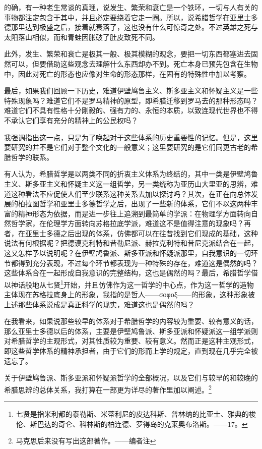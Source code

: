 \documentclass[a4paper,twoside,12pt]{ctexart}
\begin{document}
的确，有一种老生常谈的真理，说发生、繁荣和衰亡是一个铁环，一切与人有关的事物都注定包含于其中，并且必定要绕着它走一圈。所以，说希腊哲学在亚里士多德那里达到极盛之后，接着就衰落了，这也没有什么可惊奇之处。不过英雄之死与太阳落山相似，而和青蛙因胀破了肚皮致死不同。

此外，发生、繁荣和衰亡是极其一般、极其模糊的观念，要把一切东西都塞进去固然可以，但要借助这些观念去理解什么东西却办不到。死亡本身已预先包含在生物中，因此对死亡的形态也应像对生命的形态那样，在固有的特殊性中加以考察。

最后，如果我们回顾一下历史，难道伊壁鸠鲁主义、斯多亚主义和怀疑主义是一些特殊现象吗？难道它们不是罗马精神的原型，即希腊迁移到罗马去的那种形态吗？难道它们不具有性格十分刚毅的、强有力的、永恒的本质，以致连现代世界也不得不承认它们享有充分的精神上的公民权吗？

我强调指出这一点，只是为了唤起对于这些体系的历史重要性的记忆。但是，这里要研究的并不是它们对于整个文化的一般意义；这里要研究的是它们同更古老的希腊哲学的联系。

有人认为，希腊哲学是以两类不同的折衷主义体系为终结的，其中一类是伊壁鸠鲁主义、斯多亚主义和怀疑主义这一组哲学，另一类统称为亚历山大里亚的思辨，难道这种看法不应促使人们至少联系这种关系去加以探讨吗？其次，在正在向总体发展的柏拉图哲学和亚里士多德哲学之后，出现了一些新的体系，它们不以这两种丰富的精神形态为依据，而是进一步往上追溯到最简单的学派：在物理学方面转向自然哲学家，在伦理学方面转向苏格拉底学派，难道这不是值得注意的现象吗？再者，在亚里士多德之后出现的体系，仿佛都可以在往昔找到它们现成的基础，这种说法有何根据呢？把德谟克利特和昔勒尼派、赫拉克利特和昔尼克派结合在一起，这又怎样予以说明呢？在伊壁鸠鲁派、斯多亚派和怀疑派那里，自我意识的一切环节都得到充分表现，不过每个环节都表现为一种特殊的存在，难道这是偶然的吗？这些体系合在一起形成自我意识的完整结构，这也是偶然的吗？最后，希腊哲学借以神话般地从七贤\footnote{七贤是指米利都的泰勒斯、米蒂利尼的皮达科斯、普林纳的比亚士、雅典的梭伦、斯巴达的奇仑、科林斯的柏连德、罗得岛的克莱奥布洛斯。——17。}开始，并且仿佛作为这一哲学的中心点，作为这一哲学的造物主体现在苏格拉底身上的形象，我指的是哲人——σοφοξ——的形象，这种形象被上述那些体系说成是真正科学的现实，难道这也是偶然的吗？

在我看来，如果说那些较早的体系对于希腊哲学的内容较为重要、较有意义的话，那么亚里士多德以后的体系，主要是伊壁鸠鲁派、斯多亚派和怀疑派这一组学派则对希腊哲学的主观形式，对其性质较为重要、较有意义。然而正是这种主观形式，即这些哲学体系的精神承担者，由于它们的形而上学的规定，直到现在几乎完全被遗忘了。

关于伊壁鸠鲁派、斯多亚派和怀疑派哲学的全部概况，以及它们与较早的和较晚的希腊思辨的总体关系，我打算在一部更为详尽的著作里加以阐述。\footnote{马克思后来没有写出这部著作。——编者注}
\end{document}
